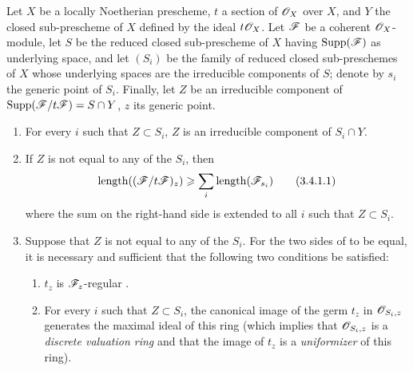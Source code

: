 \begin{proposition}[3.4.1]
\label{IV.3.4.1}
Let $X$ be a locally Noetherian prescheme, $t$ a section of $\mathscr{O}_X$ over $X$, and $Y$ the closed sub-prescheme of $X$ defined by the ideal $t\mathscr{O}_X$.
Let $\mathscr{F}$ be a coherent $\mathscr{O}_X$-module, let $S$ be the reduced closed sub-prescheme of $X$ having $\operatorname{Supp}(\mathscr{F})$ as underlying space, and let $(S_i)$ be the family of reduced closed sub-preschemes of $X$ whose underlying spaces are the irreducible components of $S$; denote by $s_i$ the generic point of $S_i$.
Finally, let $Z$ be an irreducible component of $\operatorname{Supp}(\mathscr{F}/t\mathscr{F})=S\cap Y$, $z$ its generic point.
\begin{enumerate}
  \item[\emph{(i)}] For every $i$ such that $Z\subset S_i$, $Z$ is an irreducible component of $S_i\cap Y$.
  \item[\emph{(ii)}] If $Z$ is not equal to any of the $S_i$, then
\[
\label{IV.3.4.1.1}
\operatorname{length}((\mathscr{F}/t\mathscr{F})_z)\geqslant\sum_i\operatorname{length}(\mathscr{F}_{s_i})
\tag{3.4.1.1}
\]
where the sum on the right-hand side is extended to all $i$ such that $Z\subset S_i$.
  \item[\emph{(iii)}] Suppose that $Z$ is not equal to any of the $S_i$.
  For the two sides of  to be equal, it is necessary and sufficient that the following two conditions be satisfied:
  \begin{enumerate}
    \item[\emph{$\alpha$)}] $t_z$ is $\mathscr{F}_z$-regular .
    \item[\emph{$\beta$)}] For every $i$ such that $Z\subset S_i$, the canonical image of the germ $t_z$ in $\mathscr{O}_{S_i,z}$ generates the maximal ideal of this ring (which implies that $\mathscr{O}_{S_i,z}$ is a \emph{discrete valuation ring} and that the image of $t_z$ is a \emph{uniformizer} of this ring).
  \end{enumerate}
\end{enumerate}
\end{proposition}

